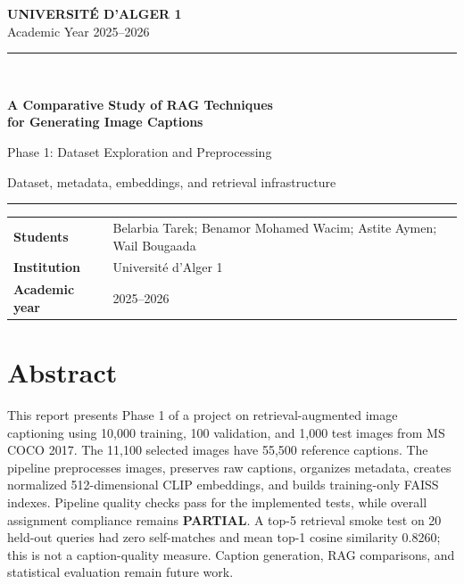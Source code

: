 \documentclass[11pt,a4paper]{article}
\begin{document}
\hypersetup{pageanchor=false}
\begin{titlepage}
\pagecolor{ProjectNavy}
\color{white}
\thispagestyle{empty}
\vspace*{18mm}
\begin{flushleft}
{\Large\bfseries UNIVERSITÉ D'ALGER 1}\\[2mm]
{\large Academic Year 2025--2026}
\end{flushleft}
\vspace{24mm}
\textcolor{ProjectLight}{\rule{\textwidth}{1.2pt}}\\[7mm]
{\LARGE\bfseries A Comparative Study of RAG Techniques\\[2mm]for Generating Image Captions\par}
\vspace{8mm}
{\LARGE Phase 1: Dataset Exploration and Preprocessing\par}
\vspace{7mm}
{\large Dataset, metadata, embeddings, and retrieval infrastructure\par}
\textcolor{ProjectLight}{\rule{\textwidth}{1.2pt}}
\vfill
\begin{tabularx}{\textwidth}{@{}>{\bfseries}lX@{}}
Students & Belarbia Tarek; Benamor Mohamed Wacim; Astite Aymen; Wail Bougaada\\
Institution & Universit\'e d'Alger 1\\
Academic year & 2025--2026\\
\end{tabularx}
\vspace{18mm}
\end{titlepage}
\hypersetup{pageanchor=true}
\pagecolor{white}
\color{ProjectInk}

\setcounter{tocdepth}{1}
\section*{Abstract}
This report presents Phase 1 of a project on retrieval-augmented image captioning using 10,000 training, 100 validation, and 1,000 test images from MS COCO 2017. The 11,100 selected images have 55,500 reference captions. The pipeline preprocesses images, preserves raw captions, organizes metadata, creates normalized 512-dimensional CLIP embeddings, and builds training-only FAISS indexes. Pipeline quality checks pass for the implemented tests, while overall assignment compliance remains \textbf{PARTIAL}. A top-5 retrieval smoke test on 20 held-out queries had zero self-matches and mean top-1 cosine similarity 0.8260; this is not a caption-quality measure. Caption generation, RAG comparisons, and statistical evaluation remain future work.
\tableofcontents
\clearpage
{}
\end{document}
